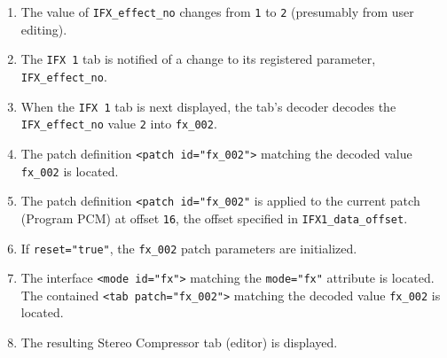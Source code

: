 \documentclass[a4paper,twoside,12pt]{article}
\newcommand{\code}[1]{\color{red}\texttt{#1}\color{black}}
\begin{document}
\begin{enumerate}
\item The value of \code{IFX\_effect\_no}{} changes from
\code{1}{} to \code{2}{} (presumably from user editing).

\item The \code{IFX 1}{} tab is notified of a change to its
registered parameter, \code{IFX\_effect\_no}.

\item When the \code{IFX 1}{} tab is next displayed, the tab's
decoder decodes the \code{IFX\_effect\_no}{} value \code{2}{} into
\code{fx\_002}.

\item The patch definition \code{<patch id="fx\_002">}{} matching
the decoded value \code{fx\_002}{} is located.

 \item The patch definition \code{<patch
id="fx\_002"}{} is applied to the current patch (Program PCM) at
offset \code{16}{}, the offset specified in
\code{IFX1\_data\_offset}.

\item If \code{reset="true"}, the \code{fx\_002}{} patch
parameters are initialized.

\item The interface \code{<mode id="fx">}{} matching the
\code{mode="fx"}{} attribute is located. The contained \code{<tab
patch="fx\_002">}{} matching the decoded value \code{fx\_002}{} is
located.

\item The resulting Stereo Compressor tab (editor) is displayed.
\end{enumerate}
\end{document}
